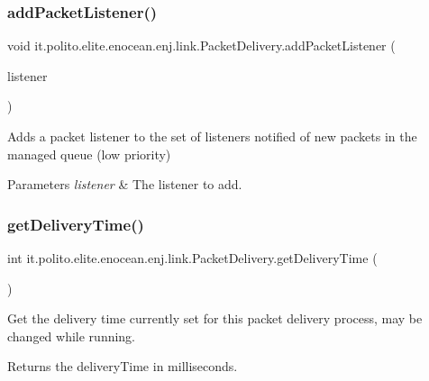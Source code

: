 \subsubsection{\texorpdfstring{add\+Packet\+Listener()}{addPacketListener()}}
{\footnotesize\ttfamily void it.\+polito.\+elite.\+enocean.\+enj.\+link.\+Packet\+Delivery.\+add\+Packet\+Listener (\begin{DoxyParamCaption}\item[{\hyperlink{interfaceit_1_1polito_1_1elite_1_1enocean_1_1enj_1_1link_1_1_packet_listener}{Packet\+Listener}}]{listener }\end{DoxyParamCaption})}

Adds a packet listener to the set of listeners notified of new packets in the managed queue (low priority)


\begin{DoxyParams}{Parameters}
{\em listener} & The listener to add. \\
\hline
\end{DoxyParams}
\hypertarget{classit_1_1polito_1_1elite_1_1enocean_1_1enj_1_1link_1_1_packet_delivery_a14a03532d13f84bfa692f0f786546416}{}\label{classit_1_1polito_1_1elite_1_1enocean_1_1enj_1_1link_1_1_packet_delivery_a14a03532d13f84bfa692f0f786546416} 
\subsubsection{\texorpdfstring{get\+Delivery\+Time()}{getDeliveryTime()}}
{\footnotesize\ttfamily int it.\+polito.\+elite.\+enocean.\+enj.\+link.\+Packet\+Delivery.\+get\+Delivery\+Time (\begin{DoxyParamCaption}{ }\end{DoxyParamCaption})}

Get the delivery time currently set for this packet delivery process, may be changed while running.

\begin{DoxyReturn}{Returns}
the delivery\+Time in milliseconds. 
\end{DoxyReturn}
\hypertarget{classit_1_1polito_1_1elite_1_1enocean_1_1enj_1_1link_1_1_packet_delivery_a63000ebd64275044cf47d1c06efe21c6}{}\label{classit_1_1polito_1_1elite_1_1enocean_1_1enj_1_1link_1_1_packet_delivery_a63000ebd64275044cf47d1c06efe21c6} 
